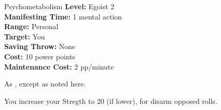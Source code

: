 {Psychometabolism}
{
	\textbf{Level:}
	Egoist 2\\
	\textbf{Manifesting Time:}
	1 mental action\\
	\textbf{Range:}
	Personal\\
	\textbf{Target:}
	You\\
	\textbf{Saving Throw:}
	None\\
	\textbf{Cost:}
	10 power points\\
	\textbf{Maintenance Cost:}
	2 pp/minute\\
}
{
	As , except as noted here.

	You increase your Stregth to 20 (if lower), for disarm opposed rolls.
}